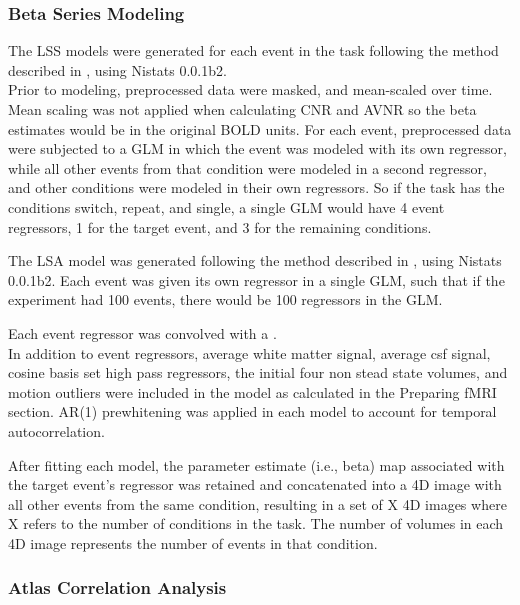 \documentclass[10pt,letterpaper]{article}
\begin{document}
\subsubsection*{Beta Series Modeling}
\label{methods:bsc_model}

The LSS models were generated for each event in
the task following the method described in \cite{Turner2012a}, using
Nistats 0.0.1b2.\\
Prior to modeling, preprocessed data were masked, and mean-scaled over
time.
Mean scaling was not applied when calculating CNR and AVNR so the
beta estimates would be in the original BOLD units.
For each event, preprocessed data were subjected to a GLM
in which the event was modeled with its own regressor, while
all other events from that condition were modeled in a second regressor,
and other conditions were modeled in their own regressors.
So if the task has the conditions switch, repeat, and single, 
a single GLM would have 4 event regressors, 1 for the target
event, and 3 for the remaining conditions.

The LSA model was generated following the method described in
\cite[Rissman 2004]{Rissman2004}, using Nistats 0.0.1b2.
Each event was given its own regressor in a single GLM, such that
if the experiment had 100 events, there would be 100 regressors in the GLM.

Each event regressor was convolved with a \cite[glover hemodynamic response
function]{Glover1999}.\\
In addition to event regressors, average white matter signal, average csf signal,
cosine basis set high pass regressors, the initial four non stead state volumes, 
and motion outliers were included
in the model as calculated in the Preparing fMRI section.
AR(1) prewhitening was applied in each model to account
for temporal autocorrelation.

After fitting each model, the parameter estimate (i.e., beta) map
associated with the target event's regressor was retained and
concatenated into a 4D image with all other events from the same
condition, resulting in a set of X 4D images where X refers to the
number of conditions in the task.
The number of volumes in each 4D image represents the number of events in that condition.


\subsubsection*{Atlas Correlation Analysis}
\label{methods:atlas-corr-analysis}
\end{document}
